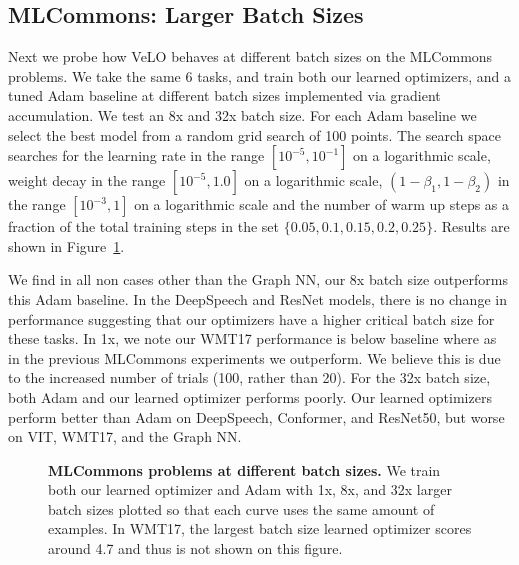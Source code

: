 \documentclass[11pt]{article}
\begin{document}
\subsection{MLCommons: Larger Batch Sizes}
Next we probe how VeLO behaves at different batch sizes on the MLCommons problems.
We take the same 6 tasks, and train both our learned optimizers, and a tuned Adam baseline at different batch sizes implemented via gradient accumulation.
We test an 8x and 32x batch size. For each Adam baseline we select the best model from a random grid search of 100 points. The search space searches for the learning rate in the range $[10^{-5}, 10^{-1}]$ on a logarithmic scale, weight decay in the range $[10^{-5}, 1.0]$ on a logarithmic scale, $(1-\beta_1,1-\beta_2)$ in the range $[10^{-3}, 1]$ on a logarithmic scale and the number of warm up steps as a fraction of the total training steps in the set $\{0.05, 0.1, 0.15, 0.2, 0.25\}$.
Results are shown in Figure~\ref{fig:init2winit_bs}.

We find in all non cases other than the Graph NN, our 8x batch size outperforms this Adam baseline.
In the DeepSpeech and ResNet models, there is no change in performance suggesting that our optimizers have a higher critical batch size for these tasks.
In 1x, we note our WMT17 performance is below baseline where as in the previous MLCommons experiments we outperform.
We believe this is due to the increased number of trials (100, rather than 20).
For the 32x batch size, both Adam and our learned optimizer performs poorly.
Our learned optimizers perform better than Adam on DeepSpeech, Conformer, and ResNet50, but worse on VIT, WMT17, and the Graph NN.

\begin{figure}[t!]
    \centering
    \caption{\textbf{MLCommons problems at different batch sizes.} We train both our learned optimizer and Adam with 1x, 8x, and 32x larger batch sizes plotted so that each curve uses the same amount of examples.
    In WMT17, the largest batch size learned optimizer scores around 4.7 and thus is not shown on this figure.
    \label{fig:init2winit_bs}
    }
\end{figure}
\end{document}
